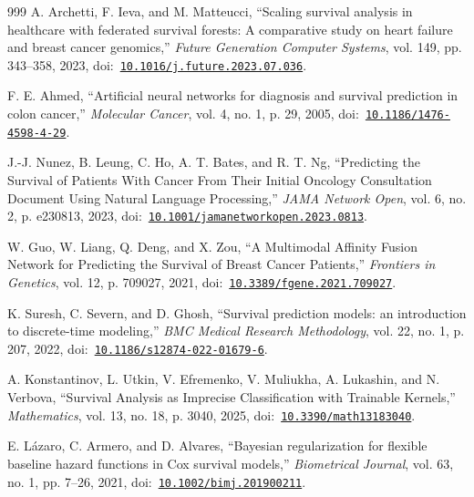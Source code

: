 \begin{thebibliography}{999}
\def\currentbiburl{https://doi.org/10.1016/j.future.2023.07.036}
 A. Archetti, F. Ieva, and M. Matteucci, ``Scaling survival analysis in healthcare with federated survival forests: A comparative study on heart failure and breast cancer genomics,'' \emph{Future Generation Computer Systems}, vol. 149, pp. 343--358, 2023, doi:~\href{https://doi.org/10.1016/j.future.2023.07.036}{\nolinkurl{10.1016/j.future.2023.07.036}}.

\def\currentbiburl{https://doi.org/10.1186/1476-4598-4-29}
 F. E. Ahmed, ``Artificial neural networks for diagnosis and survival prediction in colon cancer,'' \emph{Molecular Cancer}, vol. 4, no. 1, p. 29, 2005, doi:~\href{https://doi.org/10.1186/1476-4598-4-29}{\nolinkurl{10.1186/1476-4598-4-29}}.

\def\currentbiburl{https://doi.org/10.1001/jamanetworkopen.2023.0813}
 J.-J. Nunez, B. Leung, C. Ho, A. T. Bates, and R. T. Ng, ``Predicting the Survival of Patients With Cancer From Their Initial Oncology Consultation Document Using Natural Language Processing,'' \emph{JAMA Network Open}, vol. 6, no. 2, p. e230813, 2023, doi:~\href{https://doi.org/10.1001/jamanetworkopen.2023.0813}{\nolinkurl{10.1001/jamanetworkopen.2023.0813}}.

\def\currentbiburl{https://doi.org/10.3389/fgene.2021.709027}
 W. Guo, W. Liang, Q. Deng, and X. Zou, ``A Multimodal Affinity Fusion Network for Predicting the Survival of Breast Cancer Patients,'' \emph{Frontiers in Genetics}, vol. 12, p. 709027, 2021, doi:~\href{https://doi.org/10.3389/fgene.2021.709027}{\nolinkurl{10.3389/fgene.2021.709027}}.

\def\currentbiburl{https://doi.org/10.1186/s12874-022-01679-6}
 K. Suresh, C. Severn, and D. Ghosh, ``Survival prediction models: an introduction to discrete-time modeling,'' \emph{BMC Medical Research Methodology}, vol. 22, no. 1, p. 207, 2022, doi:~\href{https://doi.org/10.1186/s12874-022-01679-6}{\nolinkurl{10.1186/s12874-022-01679-6}}.

\def\currentbiburl{https://doi.org/10.3390/math13183040}
 A. Konstantinov, L. Utkin, V. Efremenko, V. Muliukha, A. Lukashin, and N. Verbova, ``Survival Analysis as Imprecise Classification with Trainable Kernels,'' \emph{Mathematics}, vol. 13, no. 18, p. 3040, 2025, doi:~\href{https://doi.org/10.3390/math13183040}{\nolinkurl{10.3390/math13183040}}.

\def\currentbiburl{https://doi.org/10.1002/bimj.201900211}
 E. Lázaro, C. Armero, and D. Alvares, ``Bayesian regularization for flexible baseline hazard functions in Cox survival models,'' \emph{Biometrical Journal}, vol. 63, no. 1, pp. 7--26, 2021, doi:~\href{https://doi.org/10.1002/bimj.201900211}{\nolinkurl{10.1002/bimj.201900211}}.


\end{thebibliography}
